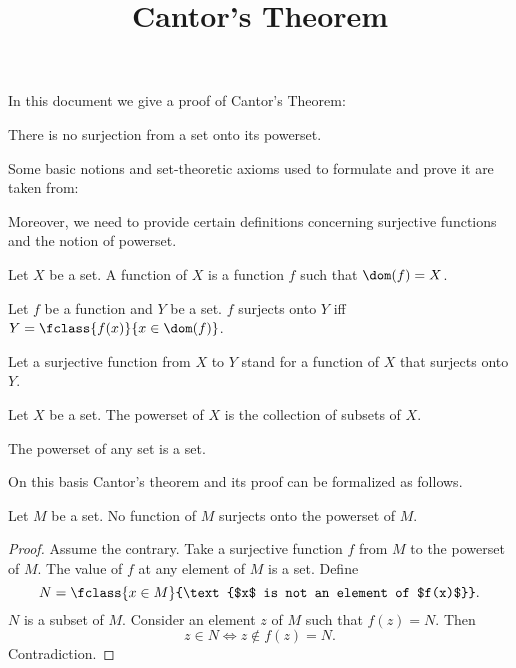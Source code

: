 \documentclass{stex}
\title{Cantor's Theorem}
\author{}
\date{}
\begin{document}
  \maketitle

  In this document we give a proof of Cantor's Theorem:

  \begin{theorem*}
    There is no surjection from a set onto its powerset.
  \end{theorem*}

  Some basic notions and set-theoretic axioms used to formulate and prove it are
  taken from:

  \begin{forthel}
  \end{forthel}

  Moreover, we need to provide certain definitions concerning surjective
  functions and the notion of powerset.

  \begin{forthel}
    \begin{definition*}
      Let $X$ be a set.
      A function of $X$ is a function $f$ such that $\dom(f) = X$.
    \end{definition*}

    \begin{definition*}
      Let $f$ be a function and $Y$ be a set.
      $f$ surjects onto $Y$ iff $Y = \fclass{f(x)}{x \in \dom(f)}$.
    \end{definition*}

    Let a surjective function from $X$ to $Y$ stand for a function of $X$ that
    surjects onto $Y$.

    \begin{definition*}
      Let $X$ be a set.
      The powerset of $X$ is the collection of subsets of $X$.
    \end{definition*}

    \begin{axiom*}
      The powerset of any set is a set.
    \end{axiom*}
  \end{forthel}

  On this basis Cantor's theorem and its proof can be formalized as follows.

  \begin{forthel}
    \begin{theorem*}[Cantor]
      Let $M$ be a set.
      No function of $M$ surjects onto the powerset of $M$.
    \end{theorem*}
    \begin{proof}
      Assume the contrary.
      Take a surjective function $f$ from $M$ to the powerset of $M$.
      The value of $f$ at any element of $M$ is a set.
      Define \[ N = \fclass{x \in M}{\text{$x$ is not an element of $f(x)$}}. \]
      $N$ is a subset of $M$.
      Consider an element $z$ of $M$ such that $f(z) = N$.
      Then \[ z \in N \iff z \notin f(z) = N. \]
      Contradiction.
    \end{proof}
  \end{forthel}
\end{document}

